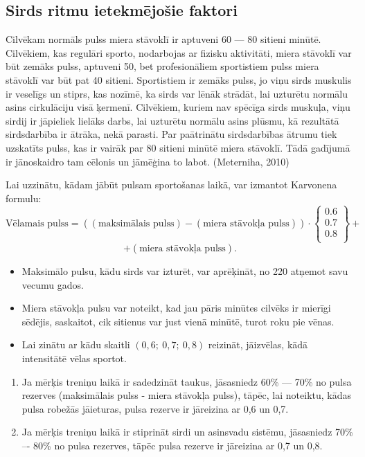 \documentclass[12pt]{article}
\begin{document}
\subsection{Sirds ritmu ietekmējošie faktori}

Cilvēkam normāls pulss miera stāvoklī ir aptuveni 60 — 80 sitieni minūtē. Cilvēkiem, kas regulāri sporto, nodarbojas ar fizisku aktivitāti, miera stāvoklī var būt zemāks pulss, aptuveni 50, bet profesionāliem sportistiem pulss miera stāvoklī var būt pat 40 sitieni. Sportistiem ir zemāks pulss, jo viņu sirds muskulis ir veselīgs un stiprs, kas nozīmē, ka sirds var lēnāk strādāt, lai uzturētu normālu asins cirkulāciju visā ķermenī. Cilvēkiem, kuriem nav spēcīga sirds muskuļa, viņu sirdij ir jāpieliek lielāks darbs, lai uzturētu normālu asins plūsmu, kā rezultātā sirdsdarbība ir ātrāka, nekā parasti. Par paātrinātu sirdsdarbības ātrumu tiek uzskatīts pulss, kas ir vairāk par 80 sitieni minūtē miera stāvoklī. Tādā gadījumā ir jānoskaidro tam cēlonis un jāmēģina to labot. (Meterniha, 2010)

Lai uzzinātu, kādam jābūt pulsam sportošanas laikā, var izmantot Karvonena formulu: 
$$\text{Vēlamais\ pulss} = ((\text{maksimālais\ pulss})  - (\text{miera\ stāvokļa\ pulss})) \cdot 
\left\{ \begin{array}{c} 0.6\\ 0.7\\ 0.8 \\ \end{array} \right\} +$$
$$ + (\text{miera\ stāvokļa\ pulss}).$$
\begin{itemize}
    \item Maksimālo pulsu, kādu sirds var izturēt, var aprēķināt, no 220 atņemot savu vecumu gados. 
    \item 	Miera stāvokļa pulsu var noteikt, kad jau pāris minūtes cilvēks ir mierīgi sēdējis, saskaitot, cik sitienus var just vienā minūtē, turot roku pie vēnas.
    \item Lai zinātu ar kādu skaitli $(0,6;\  0,7;\  0,8)$ reizināt, jāizvēlas, kādā intensitātē vēlas sportot.
\end{itemize}
	\begin{enumerate}
	    \item Ja mērķis treniņu laikā ir sadedzināt taukus, jāsasniedz 60\% — 70\% no pulsa rezer\-ves (maksimālais pulss - miera stāvokļa pulss), tāpēc, lai noteiktu, kādas pulsa robežās jāieturas, pulsa rezerve ir jāreizina ar 0,6 un 0,7.
	    \item Ja mērķis treniņu laikā ir stiprināt sirdi un asinsvadu sistēmu, jāsasniedz 70\% –- 80\% no pulsa rezerves, tāpēc pulsa rezerve ir jāreizina ar 0,7 un 0,8.
	\end{enumerate}
	
\end{document}
